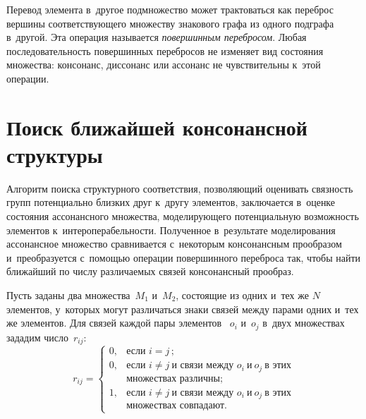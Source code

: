 \begin{multicols}{2}
     Перевод элемента в~другое подмножество может трактоваться как 
переброс вершины со\-от\-вет\-ст\-ву\-юще\-го множеству знакового графа из одного 
под\-гра\-фа в~другой. Эта операция называется \textit{повершинным 
перебросом}. Любая по\-сле\-до\-ва\-тель\-ность повершинных перебросов не 
изменяет вид со\-сто\-яния множества: консонанс, диссонанс или ассонанс не 
чувствительны к~этой операции. 

\section{Поиск ближайшей консонансной структуры}
     
     Алгоритм поиска структурного соответствия, поз\-во\-ля\-ющий оценивать 
связ\-ность групп потенциально близ\-ких друг к~другу элементов, заключается\linebreak 
в~оценке со\-сто\-яния ассонансного множества, мо\-де\-ли\-ру\-юще\-го 
потенциальную воз\-мож\-ность элементов к~ин\-тер\-опе\-ра\-бель\-ности. Полученное 
в~результате моделирования ассонансное множество \mbox{срав\-ни\-ва\-ет\-ся} 
с~некоторым консонансным прообразом и~преобразуется с~по\-мощью 
операции повершинного переброса так, что\-бы \mbox{найти} ближайший по чис\-лу 
раз\-ли\-ча\-емых связей консонансный прообраз. 
     
     Пусть заданы два множества~$M_1$ и~$M_2$, со\-сто\-ящие из одних 
и~тех же $N$ элементов, у~которых могут различаться знаки связей меж\-ду 
парами одних и~тех же элементов. Для связей каж\-дой пары элементов ~$o_i$ 
и~$o_j$ в~двух множествах зададим чис\-ло~$r_{ij}$:
$$
r_{ij} = \begin{cases}
0,  & \mbox{если } i=j\,;\\
0, & \mbox{если } i\not=j\ \mbox{и~связи\ между } o_i\ \mbox{и}\ o_j\  \mbox{в~этих}\\
& \mbox{множествах\ различны};\\
1, & \mbox{если } i\not= j\  \mbox{и~связи\ между }o_i\ \mbox{и}\ o_j\ \mbox{в~этих}\\
& \mbox{множествах\ совпадают}.
\end{cases}
$$

\begin{figure*} %
\vspace*{1pt}
\begin{center}
   \mbox{%
\epsfxsize=160.127mm
}
\end{center}
\vspace*{-9pt}
\end{figure*}
     

\end{multicols}
